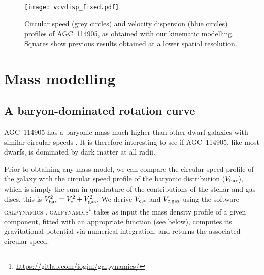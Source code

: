\documentclass[fleqn,usenatbib]{mnras}
\begin{document}

\begin{figure}
    \centering
    \texttt{[image: vcvdisp\_fixed.pdf]}
    \caption{Circular speed (grey circles) and velocity dispersion (blue circles) profiles of AGC~114905, as obtained with our kinematic modelling. Squares show previous results obtained at a lower spatial resolution.}
    \label{fig:rcvdisp}
\end{figure}







\section{Mass modelling}
\label{sec:massmodels}

\subsection{A baryon-dominated rotation curve}

AGC~114905 has a baryonic mass much higher than other dwarf galaxies with similar circular speeds \citep{iorio,huds2020}. It is therefore interesting to see if AGC~114905, like most dwarfs, is dominated by dark matter at all radii.

Prior to obtaining any mass model, we can compare the circular speed profile of the galaxy with the circular speed profile of the baryonic distribution ($V_{\rm bar}$), which is simply the sum in quadrature of the contributions of the stellar and gas discs, this is $V_{\rm bar}^2 = V_{\ast}^2 + V_{\rm gas}^2$. We derive $V_{\rm c,\ast}$ and $V_{\rm c,gas}$ using the software \textsc{galpynamics} \citep{iorio_phd}. \textsc{galpynamics}\footnote{\url{https://gitlab.com/iogiul/galpynamics/}} takes as input the mass density profile of a given component, fitted with an appropriate function (see below), computes its gravitational potential via numerical integration, and returns the associated circular speed. 
\end{document}

